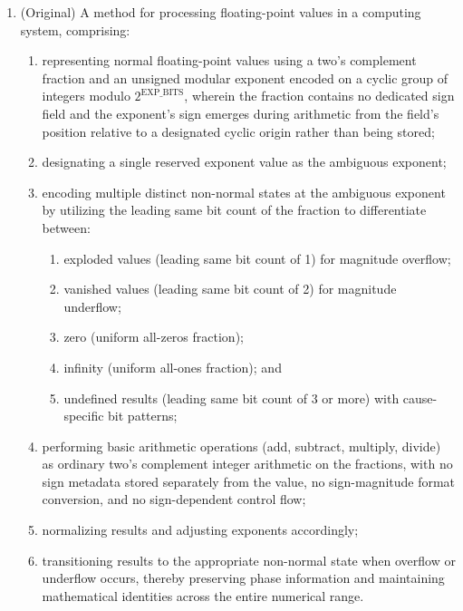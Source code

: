 \documentclass[12pt,letter]{article}
\begin{document}
\begin{enumerate}
          \item\label{cl:scalar-method} (Original) A method for processing floating-point values in a computing system, comprising:
          \begin{enumerate}
              \item representing normal floating-point values using a two's complement fraction and an unsigned modular exponent encoded on a cyclic group of integers modulo $2^{\text{EXP\_BITS}}$, wherein the fraction contains no dedicated sign field and the exponent's sign emerges during arithmetic from the field's position relative to a designated cyclic origin rather than being stored;
              \item designating a single reserved exponent value as the ambiguous exponent;
              \item encoding multiple distinct non-normal states at the ambiguous exponent by utilizing the leading same bit count of the fraction to differentiate between:
                    \begin{enumerate}
                        \item exploded values (leading same bit count of 1) for magnitude overflow;
                        \item vanished values (leading same bit count of 2) for magnitude underflow;
                        \item zero (uniform all-zeros fraction);
                        \item infinity (uniform all-ones fraction); and
                        \item undefined results (leading same bit count of 3 or more) with cause-specific bit patterns;
                    \end{enumerate}
              \item performing basic arithmetic operations (add, subtract, multiply, divide) as ordinary two's complement integer arithmetic on the fractions, with no sign metadata stored separately from the value, no sign-magnitude format conversion, and no sign-dependent control flow;
              \item normalizing results and adjusting exponents accordingly;
              \item transitioning results to the appropriate non-normal state when overflow or underflow occurs, thereby preserving phase information and maintaining mathematical identities across the entire numerical range.
          \end{enumerate}


\end{enumerate}
\end{document}
